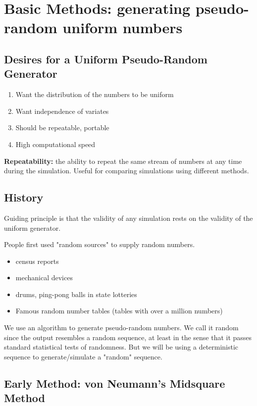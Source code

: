 \documentclass[11pt,english]{scrbook}
\begin{document}
\section{Basic Methods: generating pseudo-random uniform numbers}
\label{sec:org99fc669}

\subsection{Desires for a Uniform Pseudo-Random Generator}
\label{sec:orgb576197}
\begin{enumerate}
\item Want the distribution of the numbers to be uniform
\item Want independence of variates
\item Should be repeatable, portable
\item High computational speed
\end{enumerate}

\textbf{Repeatability:} the ability to repeat the same stream of numbers at any time during the simulation. Useful for comparing simulations using different methods.

\subsection{History}
\label{sec:org2adc946}
Guiding principle is that the validity of any simulation rests on the validity of the uniform generator.

People first used "random sources" to supply random numbers.
\begin{itemize}
\item census reports
\item mechanical devices
\item drums, ping-pong balls in state lotteries

\item Famous random number tables (tables with over a million numbers)
\end{itemize}

We use an algorithm to generate pseudo-random numbers. We call it random since the output resembles a random sequence, at least in the sense that it passes standard statistical tests of randomness. But we will be using a deterministic sequence to generate/simulate a "random" sequence.

\subsection{Early Method: von Neumann's Midsquare Method}
\label{sec:orgfa34882}
\end{document}
